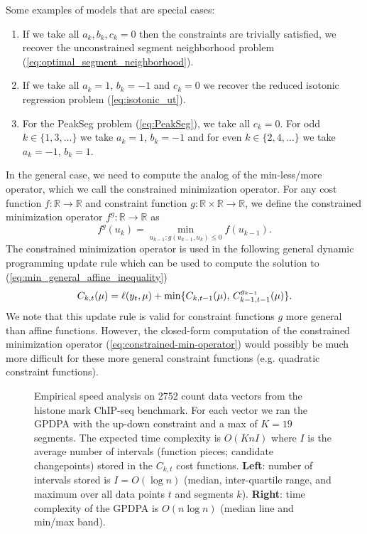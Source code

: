 \documentclass{article}
\newcommand{\RR}{\mathbb R}
\begin{document}
Some examples of models that are special cases:
\begin{enumerate}
\item If we take all $a_k,b_k,c_k=0$ then the constraints are
  trivially satisfied, we
  recover the unconstrained segment neighborhood problem
  (\ref{eq:optimal_segment_neighborhood}).
\item If we take all $a_{k} =1$, $b_{k}=-1$ and $c_{k} = 0$ we recover
  the reduced isotonic regression problem
  (\ref{eq:isotonic_ut}).
\item For the PeakSeg problem (\ref{eq:PeakSeg}),
  we take all $c_{k} = 0$. For odd $k\in\{1,3,\dots\}$ we take
  $a_{k} =1$, $b_{k}=-1$ and for even $k\in\{2,4,\dots\}$ we take
  $a_{k} =-1$, $b_{k}=1$.
\end{enumerate}
In the general case, we need to compute the analog of the
min-less/more operator, which we call the constrained minimization
operator. For any cost function $f:\RR\rightarrow\RR$ and constraint
function $g:\RR\times\RR\rightarrow\RR$, we define the constrained
minimization operator $f^g:\RR\rightarrow\RR$ as
\begin{equation}
  \label{eq:constrained-min-operator}
  f^g(u_{k}) = \min_{u_{k-1} : g(u_{k-1}, u_{k})\leq 0} f(u_{k-1}).
\end{equation}
The constrained minimization operator is used in the following general
dynamic programming update rule which can be used to compute the
solution to (\ref{eq:min_general_affine_inequality})
\begin{equation}
  \label{eq:general_dp}
  C_{k,t}(\mu) = \ell(y_t,\mu) + \min\{
  C_{k,t-1}(\mu),\,
  C_{k-1,t-1}^{g_{k-1}}(\mu)
  \}.
\end{equation}
We note that this update rule is valid for constraint functions $g$
more general than affine functions. However, the
closed-form computation of the constrained minimization operator
(\ref{eq:constrained-min-operator}) would possibly be much more
difficult for these more general constraint functions (e.g. quadratic
constraint functions).

\begin{figure}[t!]
  \centering
  \parbox{0.49\textwidth}{
    
  }
  \parbox{0.49\textwidth}{
    
  }
  \vskip -0.8cm
  \caption{Empirical speed analysis on 2752 count data vectors from
    the histone mark ChIP-seq benchmark. For each vector we ran the
    GPDPA with the up-down constraint and a max of $K=19$
    segments. The expected time complexity is $O(KnI)$ where $I$ is
    the average number of intervals (function pieces; candidate
    changepoints) stored in the $C_{k,t}$ cost
    functions. \textbf{Left}: number of intervals stored is
    $I=O(\log n)$ (median, inter-quartile range, and maximum over all
    data points $t$ and segments $k$).  \textbf{Right}: time
    complexity of the GPDPA is $O(n\log n)$ (median line and min/max
    band).}
  \label{fig:timings}
\end{figure}
\end{document}
